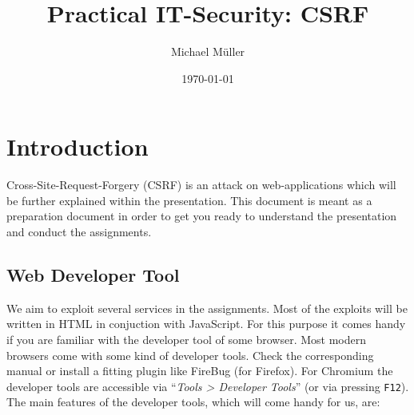 \documentclass{report}
\title{Practical IT-Security: CSRF}
\author{Michael Müller}
\date{\today}
\begin{document}
\newpage

\maketitle

\newpage


\section{Introduction}

Cross-Site-Request-Forgery (\textsc{CSRF}) is an attack on web-applications
which will be further explained within the presentation.
This document is meant as a preparation document in order to get you ready to
understand the presentation and conduct the assignments.

\begin{comment}
\subsection{HTTP}
The HTTP protocol is the driving force behind the web.

\subsubsection{GET}
foo ar



\begin{lstlisting}[
	caption=Typical HTTP GET request
]
GET / HTTP/1.1
Host: google.com
\end{lstlisting}

\begin{lstlisting}[
	caption=Typical HTTP GET reply
]
200 OK 
\end{lstlisting}

\subsubsection{POST}
\end{comment}


\subsection{Web Developer Tool}

We aim to exploit several services in the assignments. Most of the exploits
will be written in HTML in conjuction with JavaScript. For this purpose it
comes handy if you are familiar with the developer tool of some browser.
Most modern browsers come with some kind of developer tools. Check the
corresponding manual or install a fitting plugin like FireBug (for Firefox). 
For Chromium the developer tools are accessible via ``\emph{Tools > Developer 
Tools}'' (or via pressing \texttt{F12}).
The main features of the developer tools, which will come handy for us, are: 
\end{document}
